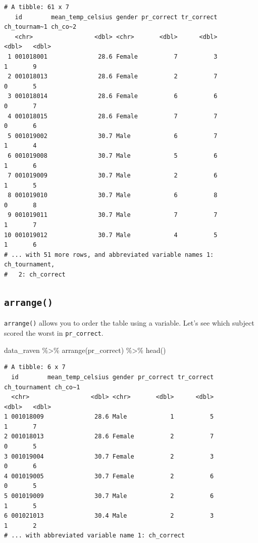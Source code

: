 \documentclass[
  letterpaper,
]{book}
\newenvironment{Shaded}{\begin{snugshade}}{\end{snugshade}}
\newcommand{\FunctionTok}[1]{\textcolor[rgb]{0.28,0.35,0.67}{#1}}
\newcommand{\NormalTok}[1]{\textcolor[rgb]{0.00,0.23,0.31}{#1}}
\newcommand{\SpecialCharTok}[1]{\textcolor[rgb]{0.37,0.37,0.37}{#1}}
\begin{document}
\begin{verbatim}
# A tibble: 61 x 7
   id        mean_temp_celsius gender pr_correct tr_correct ch_tournam~1 ch_co~2
   <chr>                 <dbl> <chr>       <dbl>      <dbl>        <dbl>   <dbl>
 1 001018001              28.6 Female          7          3            1       9
 2 001018013              28.6 Female          2          7            0       5
 3 001018014              28.6 Female          6          6            0       7
 4 001018015              28.6 Female          7          7            0       6
 5 001019002              30.7 Male            6          7            1       4
 6 001019008              30.7 Male            5          6            1       6
 7 001019009              30.7 Male            2          6            1       5
 8 001019010              30.7 Male            6          8            0       8
 9 001019011              30.7 Male            7          7            1       7
10 001019012              30.7 Male            4          5            1       6
# ... with 51 more rows, and abbreviated variable names 1: ch_tournament,
#   2: ch_correct
\end{verbatim}

\hypertarget{arrange}{%
\subsection{\texorpdfstring{\texttt{arrange()}}{arrange()}}\label{arrange}}

\texttt{arrange()} allows you to order the table using a variable. Let's
see which subject scored the worst in \texttt{pr\_correct}.

\begin{Shaded}
\begin{Highlighting}[]
\NormalTok{data\_raven }\SpecialCharTok{\%\textgreater{}\%} \FunctionTok{arrange}\NormalTok{(pr\_correct) }\SpecialCharTok{\%\textgreater{}\%} \FunctionTok{head}\NormalTok{()}
\end{Highlighting}
\end{Shaded}

\begin{verbatim}
# A tibble: 6 x 7
  id        mean_temp_celsius gender pr_correct tr_correct ch_tournament ch_co~1
  <chr>                 <dbl> <chr>       <dbl>      <dbl>         <dbl>   <dbl>
1 001018009              28.6 Male            1          5             1       7
2 001018013              28.6 Female          2          7             0       5
3 001019004              30.7 Female          2          3             0       6
4 001019005              30.7 Female          2          6             0       5
5 001019009              30.7 Male            2          6             1       5
6 001021013              30.4 Male            2          3             1       2
# ... with abbreviated variable name 1: ch_correct
\end{verbatim}
\end{document}
